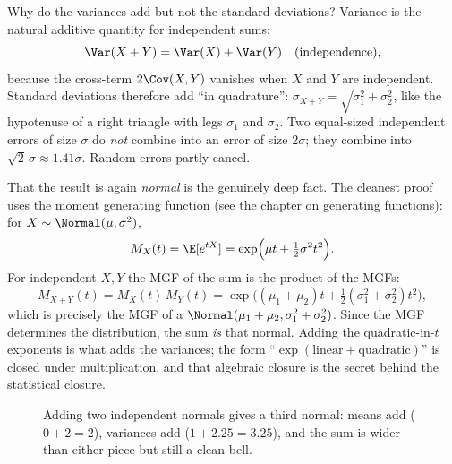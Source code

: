 \begin{whybox}
Why do the variances add but not the standard deviations? Variance is the natural
additive quantity for independent sums:
\[
  \Var(X+Y) = \Var(X) + \Var(Y) \quad (\text{independence}),
\]
because the cross-term $2\Cov(X,Y)$ vanishes when $X$ and $Y$ are independent.
Standard deviations therefore add ``in quadrature'':
$\sigma_{X+Y} = \sqrt{\sigma_1^2 + \sigma_2^2}$, like the hypotenuse of a right
triangle with legs $\sigma_1$ and $\sigma_2$. Two equal-sized independent
errors of size $\sigma$ do \emph{not} combine into an error of size $2\sigma$;
they combine into $\sqrt{2}\,\sigma \approx 1.41\sigma$. Random errors partly
cancel.

That the result is again \emph{normal} is the genuinely deep fact. The cleanest
proof uses the moment generating function (see the chapter on generating
functions): for $X\sim\Normal(\mu,\sigma^2)$,
\[
  M_X(t) = \E[e^{tX}] = \exp\!\Big(\mu t + \tfrac{1}{2}\sigma^2 t^2\Big).
\]
For independent $X,Y$ the MGF of the sum is the product of the MGFs:
\[
  M_{X+Y}(t) = M_X(t)\,M_Y(t)
  = \exp\!\Big((\mu_1+\mu_2)t + \tfrac{1}{2}(\sigma_1^2+\sigma_2^2)t^2\Big),
\]
which is precisely the MGF of a $\Normal(\mu_1+\mu_2,\sigma_1^2+\sigma_2^2)$. Since
the MGF determines the distribution, the sum \emph{is} that normal. Adding the
quadratic-in-$t$ exponents is what adds the variances; the form
``$\exp(\text{linear} + \text{quadratic})$'' is closed under multiplication, and
that algebraic closure is the secret behind the statistical closure.
\end{whybox}

\begin{figure}[H]
\centering
{}
\caption{Adding two independent normals gives a third normal: means add
($0+2=2$), variances add ($1 + 2.25 = 3.25$), and the sum is wider than either
piece but still a clean bell.}
\label{ch12:fig-sum}
\end{figure}

